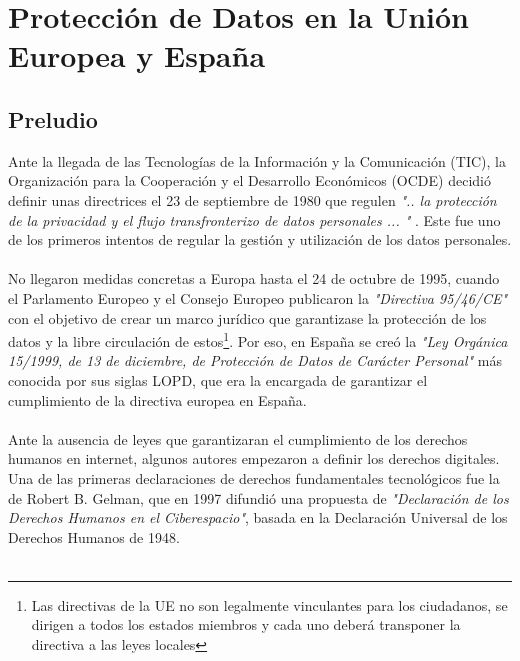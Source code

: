 \chapter{Protección de Datos en la Unión Europea y España}\label{appendix:ProteccionDatos}
\thispagestyle{fancy}
\begin{refsection}

\section{Preludio}
Ante la llegada de las Tecnologías de la Información y la Comunicación (TIC), la Organización para la Cooperación y el Desarrollo Económicos (OCDE) decidió definir unas directrices el 23 de septiembre de 1980 que regulen \textit{".. la protección de la privacidad y el flujo transfronterizo de datos personales ... "} \autocite[]{oecdOECDGuidelinesProtection2002}. Este fue uno de los primeros intentos de regular la gestión y utilización de los datos personales.
\\ \\
No llegaron medidas concretas a Europa hasta el 24 de octubre de 1995, cuando el Parlamento Europeo y el Consejo Europeo publicaron la \textit{"Directiva 95/46/CE"} \autocite{DIRECTIVA9546} con el objetivo de crear un marco jurídico que garantizase la protección de los datos y la libre circulación de estos\footnote{Las directivas de la UE no son legalmente vinculantes para los ciudadanos, se dirigen a todos los estados miembros y cada uno deberá transponer la directiva a las leyes locales}. Por eso, en España se creó la \textit{"Ley Orgánica 15/1999, de 13 de diciembre, de Protección de Datos de Carácter Personal"} \autocite{LEYORGANICA15} más conocida por sus siglas LOPD, que era la encargada de garantizar el cumplimiento de la directiva europea en España. 
\\ \\
Ante la ausencia de leyes que garantizaran el cumplimiento de los derechos humanos en internet, algunos autores empezaron a definir los derechos digitales. Una de las primeras declaraciones de derechos fundamentales tecnológicos fue la de Robert B. Gelman, que en 1997 difundió una propuesta de \textit{"Declaración de los Derechos Humanos en el Ciberespacio"}, basada en la Declaración Universal de los Derechos Humanos de 1948.
\\ \\

\end{refsection}
